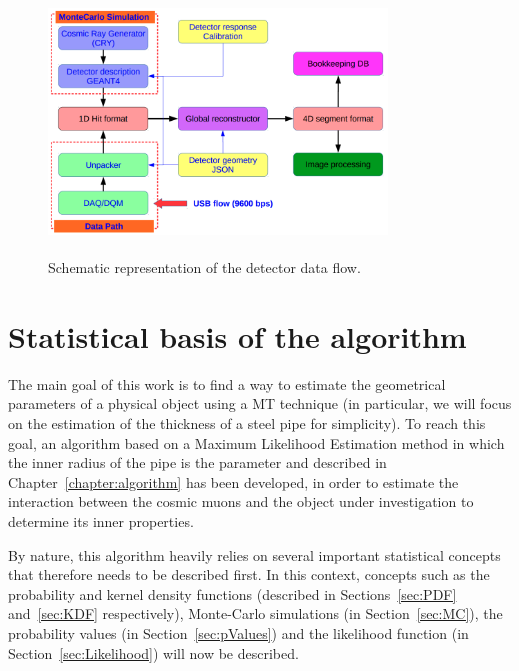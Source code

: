 \documentclass[a4paper, 11pt]{report}
\begin{document}
\begin{figure}[htbp]
\begin{center}
\includegraphics[width=9cm, height=7cm]{figs/dataFlow.png}
\caption{Schematic representation of the detector data flow.}
\label{fig:dataFlow}
\end{center}
\end{figure}



























\chapter{Statistical basis of the algorithm}

The main goal of this work is to find a way to estimate the geometrical parameters of a physical object using a MT technique (in particular, we will focus on the estimation of the thickness of a steel pipe for simplicity). To reach this goal, an algorithm based on a Maximum Likelihood Estimation method  in which the inner radius of the pipe is the parameter and described in Chapter~\ref{chapter:algorithm} has been developed, in order to estimate the interaction between the cosmic muons and the object under investigation to determine its inner properties.

By nature, this algorithm heavily relies on several important statistical concepts that therefore needs to be described first. In this context, concepts such as the probability and kernel density functions (described in Sections~\ref{sec:PDF} and~\ref{sec:KDF} respectively), Monte-Carlo simulations (in Section~\ref{sec:MC}), the probability values (in Section~\ref{sec:pValues}) and the likelihood function (in Section~\ref{sec:Likelihood}) will now be described.
\end{document}
